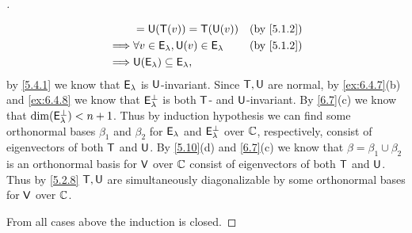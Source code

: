 \begin{proof}[]
\begin{itemize}
\begin{align*}
                     & = \U(\T(v)) = \T(\U(v))                                       &  & \by{5.1.2}    \\
            \implies & \forall v \in \vs{E}_{\lambda}, \U(v) \in \vs{E}_{\lambda}    &  & \by{5.1.2}    \\
            \implies & \U(\vs{E}_{\lambda}) \subseteq \vs{E}_{\lambda},
          \end{align*}
          by \cref{5.4.1} we know that \(\mathsf{E}_{\lambda}\) is \(\mathsf{U}\)-invariant.
          Since \(\mathsf{T}, \mathsf{U}\) are normal, by \cref{ex:6.4.7}(b) and \cref{ex:6.4.8} we know that \(\mathsf{E}_{\lambda}^{\perp}\) is both \(\mathsf{T}\)- and \(\mathsf{U}\)-invariant.
          By \cref{6.7}(c) we know that \(\dim(\mathsf{E}_{\lambda}^{\perp}) < n + 1\).
          Thus by induction hypothesis we can find some orthonormal bases \(\beta_1\) and \(\beta_2\) for \(\mathsf{E}_{\lambda}\) and \(\mathsf{E}_{\lambda}^{\perp}\) over \(\mathbb{C}\), respectively, consist of eigenvectors of both \(\mathsf{T}\) and \(\mathsf{U}\).
          By \cref{5.10}(d) and \cref{6.7}(c) we know that \(\beta = \beta_1 \cup \beta_2\) is an orthonormal basis for \(\mathsf{V}\) over \(\mathbb{C}\) consist of eigenvectors of both \(\mathsf{T}\) and \(\mathsf{U}\).
          Thus by \cref{5.2.8} \(\mathsf{T}, \mathsf{U}\) are simultaneously diagonalizable by some orthonormal bases for \(\mathsf{V}\) over \(\mathbb{C}\).
  \end{itemize}
  From all cases above the induction is closed.
\end{proof}
